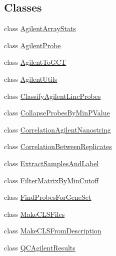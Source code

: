 \subsection*{Classes}
\begin{DoxyCompactItemize}
\item 
class \hyperlink{classbroad_1_1pda_1_1geneexpression_1_1agilent_1_1_agilent_array_stats}{Agilent\+Array\+Stats}
\item 
class \hyperlink{classbroad_1_1pda_1_1geneexpression_1_1agilent_1_1_agilent_probe}{Agilent\+Probe}
\item 
class \hyperlink{classbroad_1_1pda_1_1geneexpression_1_1agilent_1_1_agilent_to_g_c_t}{Agilent\+To\+G\+C\+T}
\item 
class \hyperlink{classbroad_1_1pda_1_1geneexpression_1_1agilent_1_1_agilent_utils}{Agilent\+Utils}
\item 
class \hyperlink{classbroad_1_1pda_1_1geneexpression_1_1agilent_1_1_classify_agilent_linc_probes}{Classify\+Agilent\+Linc\+Probes}
\item 
class \hyperlink{classbroad_1_1pda_1_1geneexpression_1_1agilent_1_1_collapse_probes_by_min_p_value}{Collapse\+Probes\+By\+Min\+P\+Value}
\item 
class \hyperlink{classbroad_1_1pda_1_1geneexpression_1_1agilent_1_1_correlation_agilent_nanostring}{Correlation\+Agilent\+Nanostring}
\item 
class \hyperlink{classbroad_1_1pda_1_1geneexpression_1_1agilent_1_1_correlation_between_replicates}{Correlation\+Between\+Replicates}
\item 
class \hyperlink{classbroad_1_1pda_1_1geneexpression_1_1agilent_1_1_extract_samples_and_label}{Extract\+Samples\+And\+Label}
\item 
class \hyperlink{classbroad_1_1pda_1_1geneexpression_1_1agilent_1_1_filter_matrix_by_min_cutoff}{Filter\+Matrix\+By\+Min\+Cutoff}
\item 
class \hyperlink{classbroad_1_1pda_1_1geneexpression_1_1agilent_1_1_find_probes_for_gene_set}{Find\+Probes\+For\+Gene\+Set}
\item 
class \hyperlink{classbroad_1_1pda_1_1geneexpression_1_1agilent_1_1_make_c_l_s_files}{Make\+C\+L\+S\+Files}
\item 
class \hyperlink{classbroad_1_1pda_1_1geneexpression_1_1agilent_1_1_make_c_l_s_from_description}{Make\+C\+L\+S\+From\+Description}
\item 
class \hyperlink{classbroad_1_1pda_1_1geneexpression_1_1agilent_1_1_q_c_agilent_results}{Q\+C\+Agilent\+Results}
\end{DoxyCompactItemize}
